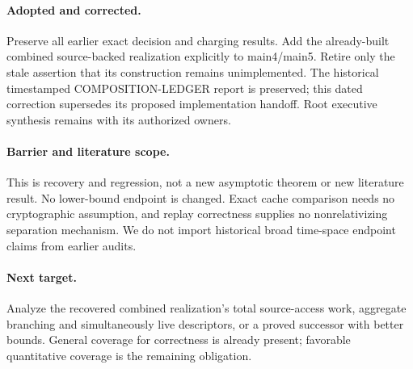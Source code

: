 \documentclass[11pt]{article}
\begin{document}
\paragraph{Adopted and corrected.}
Preserve all earlier exact decision and charging results. Add the already-built
combined source-backed realization explicitly to main4/main5. Retire only
the stale assertion that its construction remains unimplemented.
The historical timestamped COMPOSITION-LEDGER report is preserved; this dated
correction supersedes its proposed implementation handoff. Root executive
synthesis remains with its authorized owners.

\paragraph{Barrier and literature scope.}
This is recovery and regression, not a new asymptotic theorem or new
literature result. No lower-bound endpoint is changed. Exact cache comparison
needs no cryptographic assumption, and replay correctness supplies no
nonrelativizing separation mechanism. We do not import historical broad
time-space endpoint claims from earlier audits.

\paragraph{Next target.}
Analyze the recovered combined realization's total source-access work,
aggregate branching and simultaneously live descriptors, or a proved
successor with better bounds. General coverage for correctness is already
present; favorable quantitative coverage is the remaining obligation.
\end{document}
